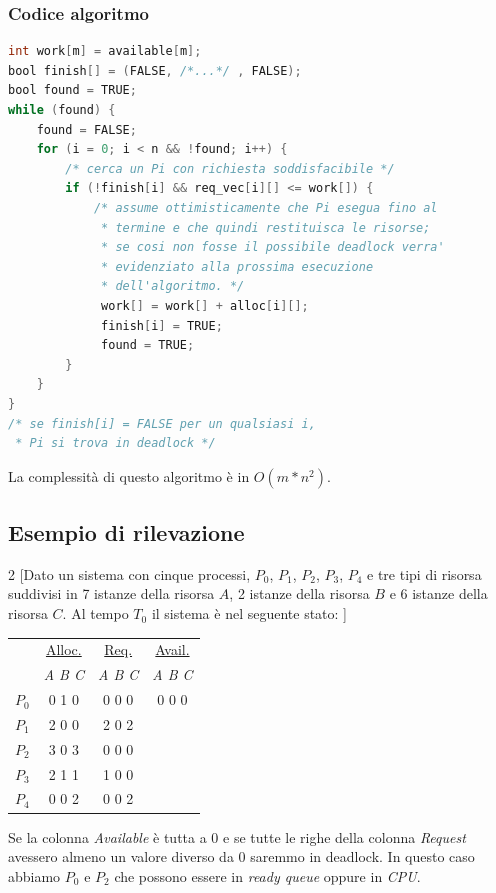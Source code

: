 \documentclass[a4paper,12pt, twoside]{report}
\begin{document}
\subsubsection{Codice algoritmo}

\begin{lstlisting}[language=C]
int work[m] = available[m];
bool finish[] = (FALSE, /*...*/ , FALSE);
bool found = TRUE;
while (found) {
	found = FALSE;
	for (i = 0; i < n && !found; i++) {
		/* cerca un Pi con richiesta soddisfacibile */
		if (!finish[i] && req_vec[i][] <= work[]) {
			/* assume ottimisticamente che Pi esegua fino al 
			 * termine e che quindi restituisca le risorse;
			 * se cosi non fosse il possibile deadlock verra'
			 * evidenziato alla prossima esecuzione 
			 * dell'algoritmo. */
			 work[] = work[] + alloc[i][];
			 finish[i] = TRUE;
			 found = TRUE;
		}
	}
}
/* se finish[i] = FALSE per un qualsiasi i, 
 * Pi si trova in deadlock */
\end{lstlisting}
La complessit\`a di questo algoritmo \`e in $O(m*n^2)$.

\newpage
\subsection{Esempio di rilevazione}

\begin{multicols}{2}
[Dato un sistema con cinque processi, $P_0$, $P_1$, $P_2$, $P_3$, $P_4$ e tre tipi di risorsa suddivisi in 7 istanze della risorsa $A$, 2 istanze della risorsa $B$ e 6 istanze della risorsa $C$. Al tempo $T_0$ il sistema \`e nel seguente stato: ]


\begin{center}
\begin{tabular}{||c | c  c  c || }
 & \underline{Alloc.} & \underline{Req.} & \underline{Avail.}  \\
 & \emph{A B C} & \emph{A B C} & \emph{A B C} \\
 $P_0$ & 0 1 0 & \colorbox{green!40}{0 0 0} &  \colorbox{teal!40}{0 0 0} \\
 $P_1$ &2 0 0 & \colorbox{orange!40}{2 0 2} &  \\
 $P_2$ & 3 0 3 & \colorbox{blue!40}{0 0 0} &  \\
 $P_3$ & 2 1 1 & 1 0 0 & \\
 $P_4$ & 0 0 2 & 0 0 2 & \\
 \end{tabular}
 \end{center}

Se la colonna \emph{Available} \`e tutta a 0 e se tutte le righe della colonna \emph{Request} avessero almeno un valore diverso da 0 saremmo in deadlock. In questo caso abbiamo $P_0$ e $P_2$ che possono essere in \emph{ready queue} oppure in \emph{CPU}.
\end{multicols}
\end{document}
